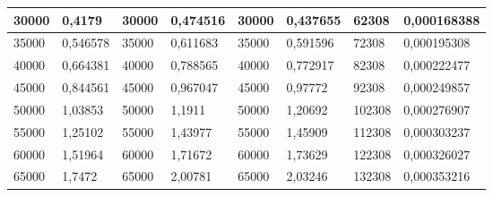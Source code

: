 \documentclass[11pt,openany]{book}
\begin{document}
\begin{table}[!ht]
\begin{tabular}{|l|l|l|l|l|l|l|l|}
        30000                                             & 0,4179                                             & 30000                                               & 0,474516                                            & 30000           & 0,437655        & 62308           & 0,000168388     \\ \hline
        35000                                             & 0,546578                                           & 35000                                               & 0,611683                                            & 35000           & 0,591596        & 72308           & 0,000195308     \\ \hline
        40000                                             & 0,664381                                           & 40000                                               & 0,788565                                            & 40000           & 0,772917        & 82308           & 0,000222477     \\ \hline
        45000                                             & 0,844561                                           & 45000                                               & 0,967047                                            & 45000           & 0,97772         & 92308           & 0,000249857     \\ \hline
        50000                                             & 1,03853                                            & 50000                                               & 1,1911                                              & 50000           & 1,20692         & 102308          & 0,000276907     \\ \hline
        55000                                             & 1,25102                                            & 55000                                               & 1,43977                                             & 55000           & 1,45909         & 112308          & 0,000303237     \\ \hline
        60000                                             & 1,51964                                            & 60000                                               & 1,71672                                             & 60000           & 1,73629         & 122308          & 0,000326027     \\ \hline
        65000                                             & 1,7472                                             & 65000                                               & 2,00781                                             & 65000           & 2,03246         & 132308          & 0,000353216     \\ \hline

\end{tabular}
\end{table}
\end{document}
